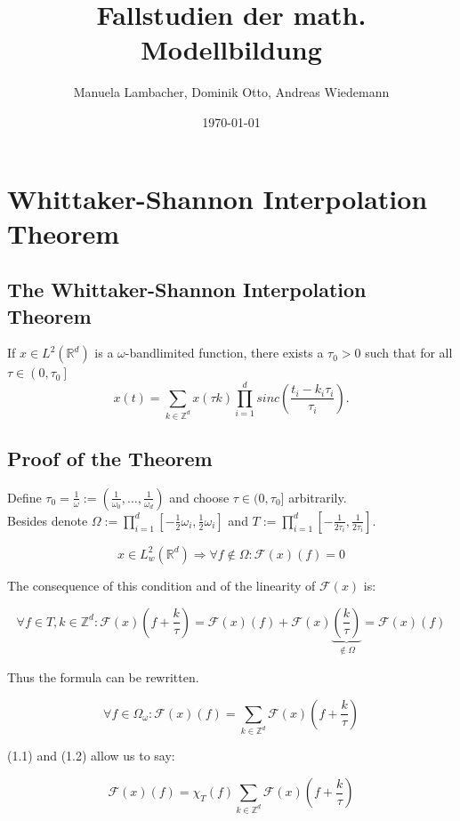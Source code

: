 \documentclass[a4paper, 11pt]{scrreprt}
\title{Fallstudien der math. Modellbildung}
\author{Manuela Lambacher, Dominik Otto, Andreas Wiedemann}
\date{\today}
\newcommand{\RR}{\mathbb{R}}
\newcommand{\ZZ}{\mathbb{Z}}
\newcommand{\FF}{\mathcal{F}}
\begin{document}
\parindent 0pt
\maketitle
\tableofcontents

\chapter{Whittaker-Shannon Interpolation Theorem}

\section{The Whittaker-Shannon Interpolation Theorem}
If \(x \in L^2(\RR^d)\) is a \(\omega\)-bandlimited function, there exists a \(\tau_0 > 0\) such that for all \(\tau \in \left(0,\tau_0\right]\)
\[x(t) = \sum_{k \in \ZZ^d} x(\tau k) \prod_{i=1}^d sinc\left(\frac{t_i-k_i \tau_i}{\tau_i}\right).\]

\section{Proof of the Theorem}
Define \(\tau_0 = \frac{1}{\omega} := \left(\frac{1}{\omega_0}, \ldots, \frac{1}{\omega_d}\right)\) and choose \(\tau \in (0,\tau_0]\) arbitrarily. \\
Besides denote \(\Omega := \prod_{i=1}^d \left[-\frac{1}{2}\omega_i ,\frac{1}{2}\omega_i\right]\) and \(T := \prod_{i=1}^d \left[-\frac{1}{2\tau_i} ,\frac{1}{2\tau_i}\right]\).

\begin{equation}
x \in L^2_w(\RR^d) \Rightarrow \forall f\notin \Omega: \FF(x)(f) = 0
\end{equation}

The consequence of this condition and of the linearity of \(\FF(x)\) is:

\[\forall f\in T, k \in \ZZ^d: \FF(x)\left(f+\frac{k}{\tau}\right) = \FF(x)(f) + \FF(x)\underbrace{\left(\frac{k}{\tau}\right)}_{\notin \Omega} = \FF(x)(f)\]

Thus the formula can be rewritten.

\begin{equation}
\forall f \in \Omega_{\omega}: \FF(x)(f) = \sum_{k \in \ZZ^d} \FF(x)\left( f+\frac{k}{\tau}\right)
\end{equation} 

(1.1) and (1.2) allow us to say:

\[\FF(x)(f) = \chi_{T}(f) \sum_{k \in \ZZ^d} \FF(x)\left(f+\frac{k}{\tau}\right)\]
\end{document}
